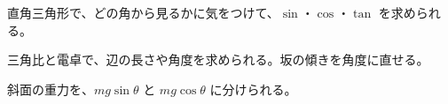 \begin{furikaeri}
\begin{checklist}
\item 直角三角形で、どの角から見るかに気をつけて、$\sin$・$\cos$・$\tan$ を求められる。
\item 三角比と電卓で、辺の長さや角度を求められる。坂の傾きを角度に直せる。
\item 斜面の重力を、$mg\sin\theta$ と $mg\cos\theta$ に分けられる。
\end{checklist}
\end{furikaeri}

